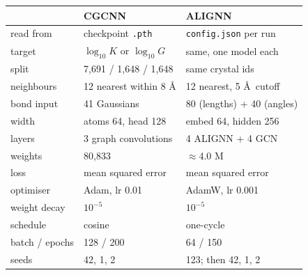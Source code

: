\begin{frame}

\begin{columns}[T]
{\sffamily\scriptsize
\begin{tabular}{@{}lll@{}}
\toprule
& \textbf{CGCNN} & \textbf{ALIGNN} \\
\midrule
read from        & checkpoint \texttt{.pth}      & \texttt{config.json} per run \\
target           & $\log_{10} K$ or $\log_{10} G$ & same, one model each \\
split            & 7{,}691 / 1{,}648 / 1{,}648   & same crystal ids \\
neighbours       & 12 nearest within 8 \AA       & 12 nearest, 5 \AA\ cutoff \\
bond input       & 41 Gaussians                  & 80 (lengths) + 40 (angles) \\
width            & atoms 64, head 128            & embed 64, hidden 256 \\
layers           & 3 graph convolutions          & 4 ALIGNN + 4 GCN \\
weights          & 80{,}833                      & $\approx$4.0 M \\
loss             & mean squared error            & mean squared error \\
optimiser        & Adam, lr 0.01                 & AdamW, lr 0.001 \\
weight decay     & $10^{-5}$                     & $10^{-5}$ \\
schedule         & cosine                        & one-cycle \\
batch / epochs   & 128 / 200                     & 64 / 150 \\
seeds            & 42, 1, 2                      & 123; then 42, 1, 2 \\
\bottomrule
\end{tabular}}



\end{columns}
\end{frame}
